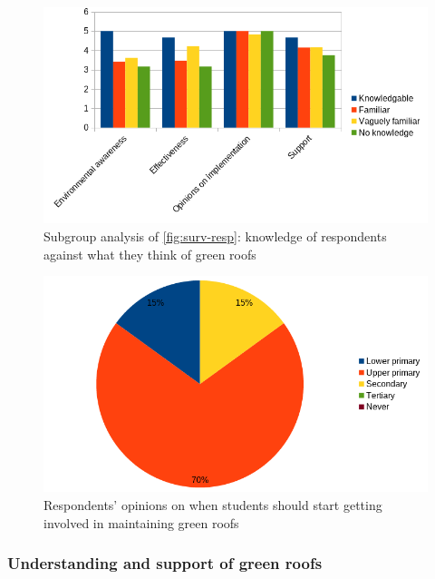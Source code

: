 \documentclass[a4paper]{article}
\begin{document}
\begin{multicols}{2}
  \begin{figure}[H]
    \Centering
    \includegraphics[width=\linewidth]{knowledge-opinions.png}
    \caption{
      Subgroup analysis of \cref{fig:surv-resp}: knowledge of respondents
      against what they think of green roofs
    }
    \label{fig:know-opn}
  \end{figure}

  \begin{figure}[H]
    \Centering
    \includegraphics[width=\linewidth]{level.png}
    \caption{
      Respondents' opinions on when students should start getting involved
      in maintaining green roofs
    }
    \label{fig:levels}
  \end{figure}

  \subsubsection{Understanding and support of green roofs}

\end{multicols}
\end{document}
